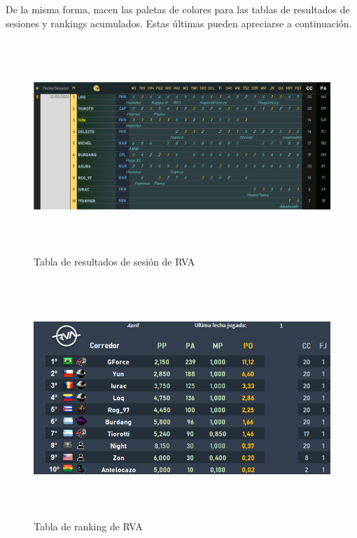 De la misma forma, nacen las paletas de colores para las tablas de resultados de sesiones y rankings acumulados. Estas últimas pueden apreciarse a continuación.

\begin{figure}[H]
  \begin{center}
    \includegraphics[width=16cm, height=8cm]{img/session_table.png} 
  \end{center}
  \caption[Tabla de resultados de sesión de RVA]{Tabla de resultados de sesión de RVA}
  \label{fig:session-table}
\end{figure}

\begin{figure}[H]
  \begin{center}
    \includegraphics[width=16cm, height=9cm]{img/ranking_table.png} 
  \end{center}
  \caption[Tabla de ranking de RVA]{Tabla de ranking de RVA}
  \label{fig:ranking-table.png}
\end{figure}

